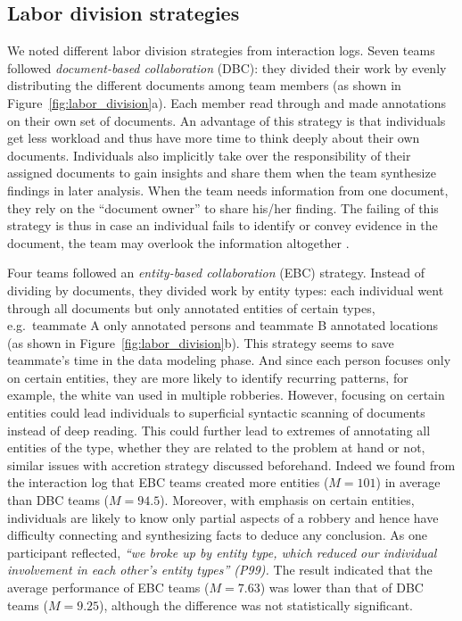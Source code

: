 \subsection{Labor division strategies}\label{labor-division-strategies}

We noted different labor division strategies from interaction logs. Seven
teams followed \emph{document-based collaboration} (DBC): they divided their
work by evenly distributing the different documents among team members
(as shown in Figure~\ref{fig:labor_division}a). Each member read
through and made annotations on their own set of documents. An advantage
of this strategy is that individuals get less workload and thus have
more time to think deeply about their own documents. Individuals also
implicitly take over the responsibility of their assigned documents to
gain insights and share them when the team synthesize findings in later
analysis. When the team needs information from one document, they rely
on the ``document owner'' to share his/her finding. The failing of this
strategy is thus in case an individual fails to identify or convey
evidence in the document, the team may overlook the information
altogether \cite{Borge2012}.

Four teams followed an \emph{entity-based collaboration} (EBC)
strategy. Instead of dividing by documents, they divided work by entity
types: each individual went through all documents but only annotated
entities of certain types, e.g.~teammate A only annotated persons and
teammate B annotated locations (as shown in 
Figure~\ref{fig:labor_division}b). This strategy seems to save teammate's time in the
data modeling phase. And since each person focuses only on certain entities,
they are more likely to identify recurring patterns, for example, the
white van used in multiple robberies. However, focusing on certain
entities could lead individuals to superficial syntactic scanning of
documents instead of deep reading. This could further lead to extremes
of annotating all entities of the type, whether they are related to the
problem at hand or not, similar issues with accretion strategy discussed 
beforehand. Indeed we found from the interaction log that EBC teams
created more entities ($M=101$) in average than DBC teams ($M=94.5$). 
Moreover, with emphasis on certain entities,
individuals are likely to know only partial aspects of a robbery and
hence have difficulty connecting and synthesizing facts to deduce any
conclusion. As one participant reflected, \emph{``we broke up by entity
type, which reduced our individual involvement in each other's entity
types'' (P99).} The result indicated that the average performance of EBC teams ($M=7.63$) was lower
than that of DBC teams ($M=9.25$), although the difference was not statistically significant.

